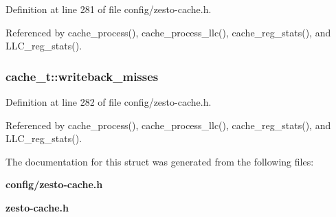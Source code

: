 Definition at line 281 of file config/zesto-cache.h.

Referenced by cache\_\-process(), cache\_\-process\_\-llc(), cache\_\-reg\_\-stats(), and LLC\_\-reg\_\-stats().
\subsubsection[{writeback\_\-misses}]{ {\bf cache\_\-t::writeback\_\-misses}}\label{structcache__t_e7445e7eae56d0c7a8b0044966012e35}




Definition at line 282 of file config/zesto-cache.h.

Referenced by cache\_\-process(), cache\_\-process\_\-llc(), cache\_\-reg\_\-stats(), and LLC\_\-reg\_\-stats().

The documentation for this struct was generated from the following files:\begin{CompactItemize}
\item 
{\bf config/zesto-cache.h}\item 
{\bf zesto-cache.h}\end{CompactItemize}
